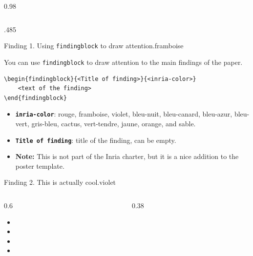 \documentclass[final,svgnames,english]{beamer}
\begin{document}
\begin{frame}[fragile]{}
\begin{columns}[T]
\begin{column}{0.98\linewidth}
\begin{columns}[T]
        \begin{column}{.485\linewidth}
          \begin{plainblock}{}
            \begin{findingblock}{Finding 1. Using \texttt{findingblock} to draw attention.}{framboise}

              You can use \texttt{findingblock} to draw attention to the main findings of the paper.
                \begin{lstlisting}[language={[LaTeX]TeX}]
\begin{findingblock}{<Title of finding>}{<inria-color>}
    <text of the finding>
\end{findingblock}
                \end{lstlisting}
              \begin{itemize}
                \item \textbf{\texttt{inria-color}}: rouge, framboise, violet, bleu-nuit, bleu-canard, bleu-azur, bleu-vert, gris-bleu, cactus, vert-tendre, jaune, orange, and sable.
                \item \textbf{\texttt{Title of finding}}: title of the finding, can be empty.
                \item \textbf{Note:} This is not part of the Inria charter, but it is a nice addition to the poster template.
              \end{itemize}
            \end{findingblock}

            \begin{findingblock}{Finding 2. This is actually cool.}{violet}
              \begin{columns}[T]
                \begin{column}{0.6\textwidth}
                  \begin{itemize}
                    \item \lipsum[1][1]
                    \item \lipsum[1][2]
                    \item \lipsum[1][3]
                    \item \lipsum[1][4]
                  \end{itemize}
                \end{column}
                \begin{column}{0.38\textwidth}
                  
                \end{column}
              \end{columns}
            \end{findingblock}


\end{plainblock}
\end{column}
\end{columns}
\end{column}
\end{columns}
\end{frame}
\end{document}
